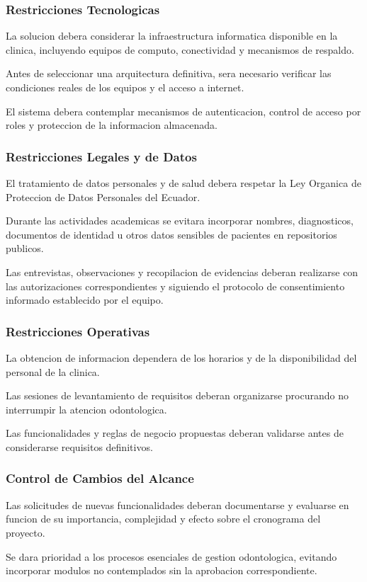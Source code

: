 \subsubsection{Restricciones Tecnologicas}

La solucion debera considerar la infraestructura
informatica disponible en la clinica, incluyendo
equipos de computo, conectividad y mecanismos
de respaldo.

Antes de seleccionar una arquitectura definitiva,
sera necesario verificar las condiciones reales
de los equipos y el acceso a internet.

El sistema debera contemplar mecanismos de
autenticacion, control de acceso por roles y
proteccion de la informacion almacenada.

\subsubsection{Restricciones Legales y de Datos}

El tratamiento de datos personales y de salud
debera respetar la Ley Organica de Proteccion
de Datos Personales del Ecuador.

Durante las actividades academicas se evitara
incorporar nombres, diagnosticos, documentos
de identidad u otros datos sensibles de
pacientes en repositorios publicos.

Las entrevistas, observaciones y recopilacion
de evidencias deberan realizarse con las
autorizaciones correspondientes y siguiendo
el protocolo de consentimiento informado
establecido por el equipo.

\subsubsection{Restricciones Operativas}

La obtencion de informacion dependera de los
horarios y de la disponibilidad del personal
de la clinica.

Las sesiones de levantamiento de requisitos
deberan organizarse procurando no interrumpir
la atencion odontologica.

Las funcionalidades y reglas de negocio
propuestas deberan validarse antes de
considerarse requisitos definitivos.

\subsubsection{Control de Cambios del Alcance}

Las solicitudes de nuevas funcionalidades
deberan documentarse y evaluarse en funcion
de su importancia, complejidad y efecto
sobre el cronograma del proyecto.

Se dara prioridad a los procesos esenciales
de gestion odontologica, evitando incorporar
modulos no contemplados sin la aprobacion
correspondiente.
